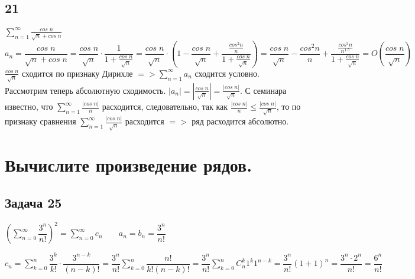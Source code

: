\documentclass[a4paper,fleqn]{article}
\begin{document}
	\subsection*{21}
	$\displaystyle \sum\limits_{n=1}^{\infty} \frac{cos \; n}{\sqrt{n} + cos \; n}$ \\
	\begin{equation*} a_n = \frac{cos \; n}{\sqrt{n} + cos \; n} = \frac{cos \; n}{\sqrt{n}} \cdot \frac{1}{1+\frac{cos\; n}{\sqrt{n}}} = \frac{cos\; n}{\sqrt{n}} \cdot (1 - \frac{cos\; n}{\sqrt{n}} + \frac{\frac{cos^2n}{n}}{1 + \frac{cos\; n}{\sqrt{n}}}) = \frac{cos\; n}{\sqrt{n}} - \frac{cos^2n}{n} + \frac{\frac{cos^3n}{n^{1.5}}}{1 + \frac{cos\; n}{\sqrt{n}}} = O(\frac{cos \; n}{\sqrt{n}})\end{equation*}
	$\displaystyle \frac{cos \; n}{\sqrt{n}}$ сходится по признаку Дирихле $\displaystyle => \sum\limits_{n=1}^{\infty} a_n$ сходится условно. \\
	Рассмотрим теперь абсолютную сходимость. $\displaystyle |a_n| = \left|\frac{cos \; n}{\sqrt{n}}\right| = \frac{|cos \; n|}{\sqrt{n}}$. С семинара известно, что $\displaystyle \sum\limits_{n = 1}^{\infty} \frac{|cos\; n|}{n}$ расходится, следовательно, так как $\displaystyle \frac{|cos\; n|}{n} \leq \frac{|cos\; n|}{\sqrt{n}}$, то по признаку сравнения $\sum\limits_{n = 1}^{\infty} \frac{|cos\; n|}{\sqrt{n}}$ расходится $\displaystyle =>$ ряд расходится абсолютно. \\
	
	
	
	\section*{Вычислите произведение рядов.}
	
	\subsection*{Задача 25}
	$ \left(\sum_{n = 0}^{\infty}\dfrac{3^n}{n!}\right)^2  = \sum_{n=0}^{\infty} c_n \;\;\;\;\;\;\; a_n = b_n = \dfrac{3^n}{n!}$
	
	$ c_n = \sum_{k=0}^{n} \dfrac{3^k}{k!}\cdot \dfrac{3^{n-k}}{(n-k)!} = \dfrac{3^n}{n!} \sum_{k=0}^{n}\dfrac{n!}{k!(n-k)!} = \dfrac{3^n}{n!}\sum_{k=0}^{n}C_n^k 1^k1^{n-k} = \dfrac{3^n}{n!}(1+1)^n = \dfrac{3^n \cdot 2^n}{n!}  = \dfrac{6^n}{n!}$
	
\end{document}
